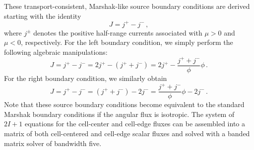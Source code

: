 These transport-consistent, Marshak-like source boundary conditions are derived starting with the identity
\begin{equation}
J=j^+ - j^- \,,
\end{equation}
where $j^\pm$ denotes the positive half-range currents associated with $\mu >0$ and $\mu <0$, respectively.  For the left boundary condition, 
we simply perform the following algebraic manipulations:
\begin{equation}
J = j^+ - j^-  = 2j^+ - (j^+ + j^-) = 2j^+ - \frac{j^+ + j^-}{\phi} \phi \, .
\end{equation}
For the right boundary condition, we similarly obtain
\begin{equation}
J = j^+ - j^-  = (j^+ + j^-) - 2j^- = \frac{j^+ + j^-}{\phi} \phi - 2j^-\, .
\end{equation}
Note that these source boundary conditions become equivalent to the standard Marshak boundary conditions if the \SN angular flux 
is isotropic. 
The system of $2I+1$ equations for the cell-center and cell-edge fluxes can be assembled into a matrix of both cell-centered and cell-edge scalar fluxes and solved with a banded matrix solver of bandwidth five. 

	
	
